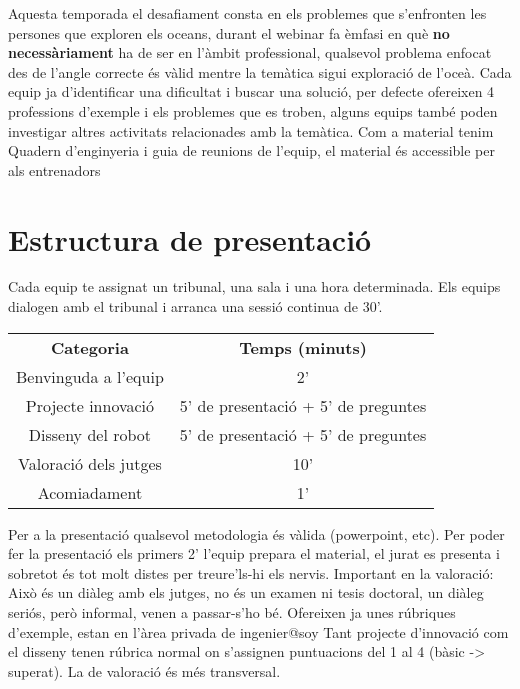 \documentclass{article}
\begin{document}
Aquesta temporada el desafiament consta en els problemes que s'enfronten les persones que exploren els oceans, durant el webinar fa èmfasi en què \textbf{no necessàriament} ha de ser en l'àmbit professional, qualsevol problema enfocat des de l'angle correcte és vàlid mentre la temàtica sigui exploració de l'oceà.
\hfill \break\hfill \break
Cada equip ja d’identificar una dificultat i buscar una solució, per defecte ofereixen 4 professions d’exemple i els problemes que es troben, alguns equips també poden investigar altres activitats relacionades amb la temàtica. Com a material tenim Quadern d'enginyeria i guia de reunions de l'equip, el material és accessible per als entrenadors 


\section{Estructura de presentació}

Cada equip te assignat un tribunal, una sala i una hora determinada. Els equips dialogen amb el tribunal i arranca una sessió continua de 30’.

\hfill \break\hfill \break
\begin{tabular}{ |c|c| } 

 \hline

 \textbf{Categoria} & \textbf{Temps (minuts)} \\ 

 Benvinguda a l'equip  & 2'  \\ 

 Projecte innovació & 5' de presentació + 5' de preguntes   \\ 

 Disseny del robot & 5' de presentació + 5' de preguntes  \\ 

 Valoració dels jutges & 10'  \\ 

 Acomiadament & 1'   \\ 

 \hline

\end{tabular}

\hfill \break\hfill \break
Per a la presentació qualsevol metodologia és vàlida (powerpoint, etc). Per poder fer la presentació els primers 2' l’equip prepara el material, el jurat es presenta i sobretot és tot molt distes per treure'ls-hi els nervis. Important en la valoració: Això és un diàleg amb els jutges, no és un examen ni tesis doctoral, un diàleg seriós, però informal, venen a passar-s’ho bé. 
\hfill \break\hfill \break
Ofereixen ja unes rúbriques d’exemple, estan en l’àrea privada de ingenier@soy
\hfill \break\hfill \break
Tant projecte d’innovació com el disseny tenen rúbrica normal on s'assignen puntuacions del 1 al 4 (bàsic -> superat). La de valoració és més transversal.
\end{document}
